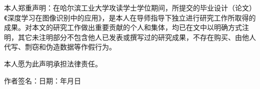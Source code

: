 
本人郑重声明：在哈尔滨工业大学攻读学士学位期间，所提交的毕业设计（论文）《深度学习在图像识别中的应用》，是本人在导师指导下独立进行研究工作所取得的成果。对本文的研究工作做出重要贡献的个人和集体，均已在文中以明确方式注明，其它未注明部分不包含他人已发表或撰写过的研究成果，不存在购买、由他人代写、剽窃和伪造数据等作假行为。

本人愿为此声明承担法律责任。

\vspace{\baselineskip}
\hspace{6em}作者签名：\hfill 日期：\hspace{2.5em}年\hspace{1.5em}月\hspace{1.5em}日


